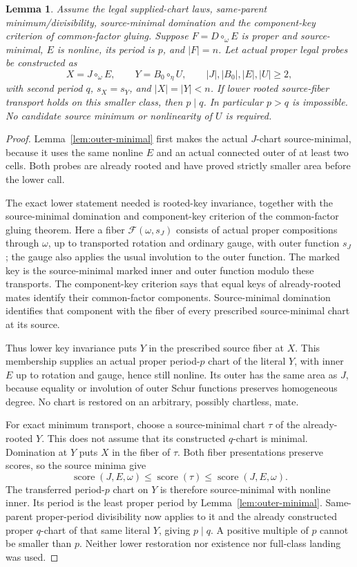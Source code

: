 \documentclass[11pt,a4paper]{amsart}
\numberwithin{equation}{section}
\theoremstyle{plain}
\newtheorem{lemma}[theorem]{Lemma}
\theoremstyle{definition}
\begin{document}
\begin{lemma}\label{lem:oo-rooted-finish}
Assume the legal supplied-chart laws, same-parent minimum/divisibility, source-minimal domination and the component-key criterion of common-factor gluing.  Suppose \(F=D\circ_\omega E\) is proper and source-minimal, \(E\) is nonline, its period is \(p\), and \(|F|=n\).  Let actual proper legal probes be constructed as
\[
 X=J\circ_\omega E,\qquad Y=B_0\circ_\eta U,
 \qquad |J|,|B_0|,|E|,|U|\ge2,
\]
with second period \(q\), \(s_X=s_Y\), and \(|X|=|Y|<n\).  If lower rooted source-fiber transport holds on this smaller class, then \(p\mid q\).  In particular \(p>q\) is impossible.  No candidate source minimum or nonlinearity of \(U\) is required.
\end{lemma}
\begin{proof}
Lemma~\ref{lem:outer-minimal} first makes the actual \(J\)-chart source-minimal, because it uses the same nonline \(E\) and an actual connected outer of at least two cells.  Both probes are already rooted and have proved strictly smaller area before the lower call.

The exact lower statement needed is rooted-key invariance, together with the source-minimal domination and component-key criterion of the common-factor gluing theorem.  Here a fiber \(\mathcal F(\omega,s_J)\) consists of actual proper compositions through \(\omega\), up to transported rotation and ordinary gauge, with outer function \(s_J\); the gauge also applies the usual involution to the outer function.  The marked key is the source-minimal marked inner and outer function modulo these transports.  The component-key criterion says that equal keys of already-rooted mates identify their common-factor components.  Source-minimal domination identifies that component with the fiber of every prescribed source-minimal chart at its source.

Thus lower key invariance puts \(Y\) in the prescribed source fiber at \(X\).  This membership supplies an actual proper period-\(p\) chart of the literal \(Y\), with inner \(E\) up to rotation and gauge, hence still nonline.  Its outer has the same area as \(J\), because equality or involution of outer Schur functions preserves homogeneous degree.  No chart is restored on an arbitrary, possibly chartless, mate.

For exact minimum transport, choose a source-minimal chart \(\tau\) of the already-rooted \(Y\).  This does not assume that its constructed \(q\)-chart is minimal.  Domination at \(Y\) puts \(X\) in the fiber of \(\tau\).  Both fiber presentations preserve scores, so the source minima give
\[
 \operatorname{score}(J,E,\omega)
 \le\operatorname{score}(\tau)
 \le\operatorname{score}(J,E,\omega).
\]
The transferred period-\(p\) chart on \(Y\) is therefore source-minimal with nonline inner.  Its period is the least proper period by Lemma~\ref{lem:outer-minimal}.  Same-parent proper-period divisibility now applies to it and the already constructed proper \(q\)-chart of that same literal \(Y\), giving \(p\mid q\).  A positive multiple of \(p\) cannot be smaller than \(p\).  Neither lower restoration nor existence nor full-class landing was used.
\end{proof}
\end{document}
